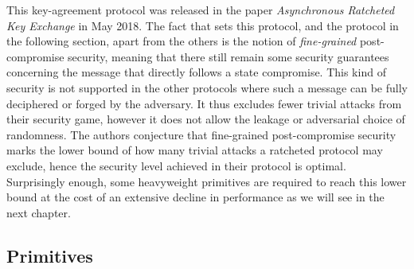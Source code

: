\documentclass[11pt,a4paper,twoside,openright,bibliography=totoc]{scrbook}
\begin{document}
This key-agreement protocol was released in the paper
\textit{Asynchronous Ratcheted Key Exchange} in May 2018.
The fact that sets this protocol, and the protocol in the following
section, apart from the others is the notion of \textit{fine-grained}
post-compromise security, meaning that there still remain some
security guarantees concerning the message that directly follows a
state compromise. This kind of security is not supported in
the other protocols where such a message can be fully deciphered
or forged by the adversary. It thus excludes fewer trivial attacks
from their security game, however it does not allow the leakage
or adversarial choice of randomness. The authors conjecture that
fine-grained post-compromise security marks the lower bound
of how many trivial attacks a ratcheted protocol may exclude, hence
the security level achieved in their protocol is optimal.
Surprisingly enough, some heavyweight primitives are required
to reach this lower bound at the cost of an extensive decline
in performance as we will see in the next chapter.

\subsection{Primitives}
\label{sec:primitives}
\end{document}
